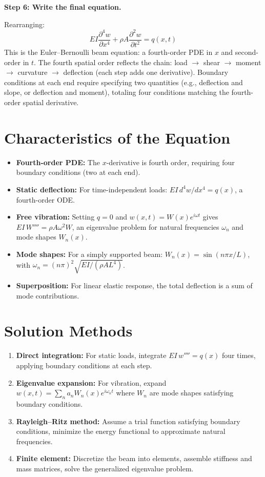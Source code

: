\textbf{Step 6: Write the final equation.}

Rearranging:
\begin{equation}
\boxed{EI\frac{\partial^4 w}{\partial x^4} + \rho A\frac{\partial^2 w}{\partial t^2} = q(x,t)}
\end{equation}
This is the Euler--Bernoulli beam equation: a fourth-order PDE in $x$ and second-order in $t$. The fourth spatial order reflects the chain: load $\to$ shear $\to$ moment $\to$ curvature $\to$ deflection (each step adds one derivative). Boundary conditions at each end require specifying two quantities (e.g., deflection and slope, or deflection and moment), totaling four conditions matching the fourth-order spatial derivative.

\section*{Characteristics of the Equation}

\begin{itemize}
\item \textbf{Fourth-order PDE:} The $x$-derivative is fourth order, requiring four boundary conditions (two at each end).
\item \textbf{Static deflection:} For time-independent loads: $EI \, d^4w/dx^4 = q(x)$, a fourth-order ODE.
\item \textbf{Free vibration:} Setting $q = 0$ and $w(x,t) = W(x)e^{i\omega t}$ gives $EI \, W'''' = \rho A \omega^2 W$, an eigenvalue problem for natural frequencies $\omega_n$ and mode shapes $W_n(x)$.
\item \textbf{Mode shapes:} For a simply supported beam: $W_n(x) = \sin(n\pi x/L)$, with $\omega_n = (n\pi)^2 \sqrt{EI/(\rho A L^4)}$.
\item \textbf{Superposition:} For linear elastic response, the total deflection is a sum of mode contributions.
\end{itemize}
\section*{Solution Methods}

\begin{enumerate}
\item \textbf{Direct integration:} For static loads, integrate $EI \, w'''' = q(x)$ four times, applying boundary conditions at each step.
\item \textbf{Eigenvalue expansion:} For vibration, expand $w(x,t) = \sum_n a_n W_n(x) e^{i\omega_n t}$ where $W_n$ are mode shapes satisfying boundary conditions.
\item \textbf{Rayleigh--Ritz method:} Assume a trial function satisfying boundary conditions, minimize the energy functional to approximate natural frequencies.
\item \textbf{Finite element:} Discretize the beam into elements, assemble stiffness and mass matrices, solve the generalized eigenvalue problem.
\end{enumerate}
